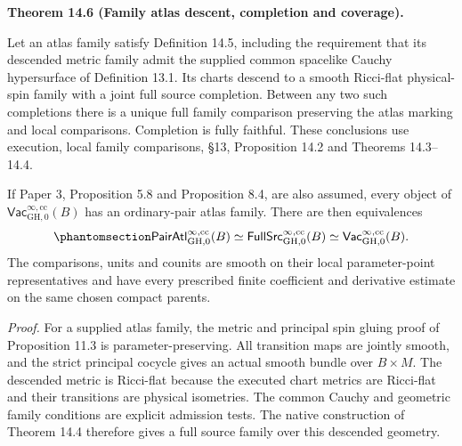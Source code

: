 \documentclass[
  english,
  11pt,
  reqno]{amsart}
\makeatletter
\newcommand{\pandocstatementheading}[1]{%
  \par\if@nobreak\else
    \addpenalty{\@beginparpenalty}%
    \addvspace{.5\baselineskip plus .2\baselineskip minus .2\baselineskip}%
  \fi
  {\normalfont\bfseries #1\par}%
  \nobreak\@afterindenttrue\@afterheading
}
\makeatother
\begin{document}
\pandocstatementheading{\protect{}\label{thm:family-atlas-completion-correspondence}Theorem 14.6 (Family atlas descent, completion and coverage).}

Let an atlas family satisfy Definition 14.5, including the requirement
that its descended metric family admit the supplied common spacelike
Cauchy hypersurface of Definition 13.1. Its charts descend to a smooth
Ricci-flat physical-spin family with a joint full source completion.
Between any two such completions there is a unique full family
comparison preserving the atlas marking and local comparisons.
Completion is fully faithful. These conclusions use execution, local
family comparisons, §13, Proposition 14.2 and Theorems 14.3--14.4.

If Paper 3, Proposition 5.8 and Proposition 8.4, are also assumed, every
object of \(\mathsf{Vac}^{\infty,\mathrm{cc}}_{\mathrm{GH},0}(B)\) has
an ordinary-pair atlas family. There are then equivalences
\begin{equation}\protect\phantomsection\label{eq:family-three-correspondences}{
\mathsf{PairAtl}^{\infty,\mathrm{cc}}_{\mathrm{GH},0}(B)
\simeq
\mathsf{FullSrc}^{\infty,\mathrm{cc}}_{\mathrm{GH},0}(B)
\simeq
\mathsf{Vac}^{\infty,\mathrm{cc}}_{\mathrm{GH},0}(B).
}\end{equation} The comparisons, units and counits are smooth on their
local parameter-point representatives and have every prescribed finite
coefficient and derivative estimate on the same chosen compact parents.

\emph{Proof.} For a supplied atlas family, the metric and principal spin
gluing proof of Proposition 11.3 is parameter-preserving. All transition
maps are jointly smooth, and the strict principal cocycle gives an
actual smooth bundle over \(B\times M\). The descended metric is
Ricci-flat because the executed chart metrics are Ricci-flat and their
transitions are physical isometries. The common Cauchy and geometric
family conditions are explicit admission tests. The native construction
of Theorem 14.4 therefore gives a full source family over this descended
geometry.
\end{document}
